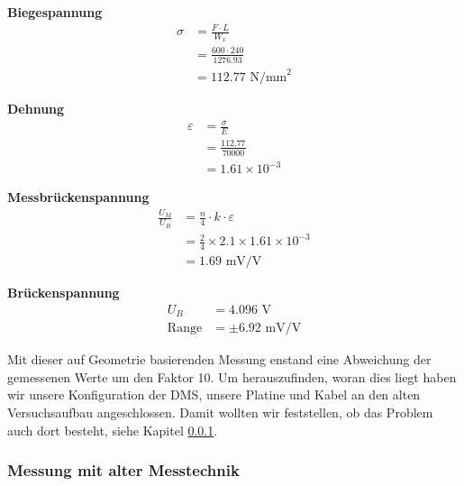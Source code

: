 \textbf{Biegespannung}
\begin{align*}
\sigma &= \frac{F \cdot L}{W_x} \\
       &= \frac{600 \cdot 240}{1276.93} \\
       &= 112.77 \text{ N/mm}^2
\end{align*}

\textbf{Dehnung}
\begin{align*}
\varepsilon &= \frac{\sigma}{E} \\
            &= \frac{112.77}{70000} \\
            &= 1.61 \times 10^{-3}
\end{align*}

\textbf{Messbrückenspannung}
\begin{align*}
\frac{U_M}{U_B} &= \frac{n}{4} \cdot k \cdot \varepsilon \\
                &= \frac{2}{4} \times 2.1 \times 1.61 \times 10^{-3} \\
                &= 1.69 \text{ mV/V}
\end{align*}

\textbf {Brückenspannung}
\begin{align*}
U_B &= 4.096 \text{ V} \\
\text{Range} &= \pm 6.92 \text{ mV/V}
\end{align*}


Mit dieser auf Geometrie basierenden Messung enstand eine Abweichung der gemessenen Werte um den Faktor 10.
Um herauszufinden, woran dies liegt haben wir unsere Konfiguration der DMS,
unsere Platine und Kabel an den alten Versuchsaufbau angeschlossen. Damit wollten wir feststellen, ob das Problem auch dort besteht, siehe Kapitel \ref{sec:altetechnik}.




\subsubsection{Messung mit alter Messtechnik}
\label{sec:altetechnik}

